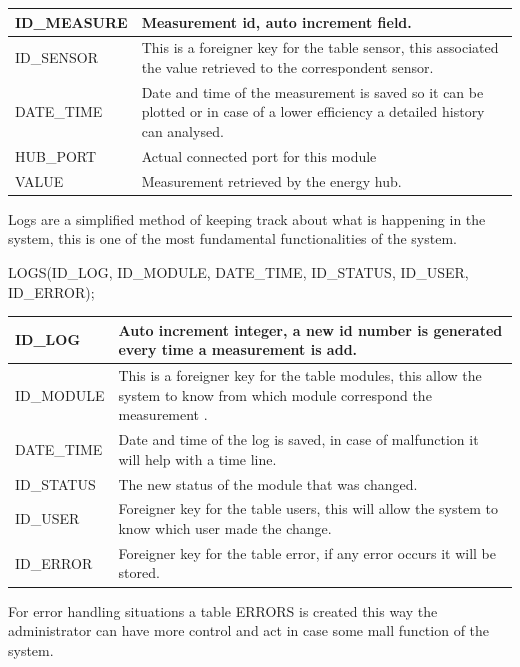 \begin{table}[H]
\centering
	\begin{tabular}{| p{2cm} | p{10cm} |}
		\hline
		ID\_MEASURE &  Measurement id, auto increment field.\\\hline
		ID\_SENSOR & This is a foreigner key for the table sensor, this associated the value retrieved to the correspondent sensor. \\\hline
		DATE\_TIME & Date and time of the measurement is saved so it can be plotted or in case of a lower efficiency a detailed history can analysed. \\\hline
		HUB\_PORT & Actual connected port for this module\\\hline
		VALUE & Measurement retrieved by the energy hub.\\\hline
	\end{tabular}
\end{table}

Logs are a simplified method of keeping track about what is happening in the system, this is one of the most fundamental functionalities of the system.

LOGS(ID\_LOG, ID\_MODULE, DATE\_TIME, ID\_STATUS, ID\_USER, ID\_ERROR);

\begin{table}[H]
\centering
	\begin{tabular}{| p{2cm} | p{10cm} |}
		\hline
		ID\_LOG & Auto increment integer, a new id number is generated every time a measurement is add. \\\hline
		ID\_MODULE & This is a foreigner key for the table modules, this allow the system to know from which module correspond the measurement .\\\hline
		DATE\_TIME & Date and time of the log is saved, in case of malfunction it will help with a time line. \\\hline
		ID\_STATUS & The new status of the module that was changed.\\\hline
		ID\_USER & Foreigner key for the table users, this will allow the system to know which user made the change. \\\hline
		ID\_ERROR & Foreigner key for the table error, if any error occurs it will be stored. \\\hline
	\end{tabular}
\end{table}

For error handling situations a table ERRORS is created this way the administrator can have more control and act in case some mall function of the system.
\\\\


